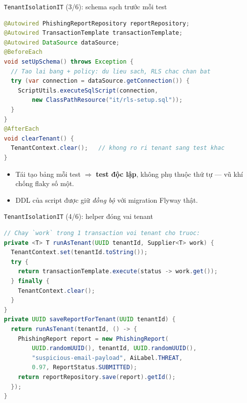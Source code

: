 \documentclass[aspectratio=169,12pt]{beamer}
\begin{document}
\begin{frame}[fragile]{\texttt{TenantIsolationIT} (3/6): schema sạch trước mỗi test}
  \vspace*{-0.4em}
\begin{lstlisting}[language=Java,style=code,basicstyle=\ttfamily\scriptsize]
@Autowired PhishingReportRepository reportRepository;
@Autowired TransactionTemplate transactionTemplate;
@Autowired DataSource dataSource;
@BeforeEach
void setUpSchema() throws Exception {
  // Tao lai bang + policy: du lieu sach, RLS chac chan bat
  try (var connection = dataSource.getConnection()) {
    ScriptUtils.executeSqlScript(connection,
        new ClassPathResource("it/rls-setup.sql"));
  }
}
@AfterEach
void clearTenant() {
  TenantContext.clear();   // khong ro ri tenant sang test khac
}
\end{lstlisting}
  \begin{itemize}\small
    \item Tái tạo bảng mỗi test $\Rightarrow$ \textbf{test độc lập}, không phụ
      thuộc thứ tự --- vũ khí chống flaky số một.
    \item DDL của script được giữ \emph{đồng bộ} với migration Flyway thật.
  \end{itemize}
\end{frame}

\begin{frame}[fragile]{\texttt{TenantIsolationIT} (4/6): helper đóng vai tenant}
  \vspace*{-0.8em}
\begin{lstlisting}[language=Java,style=code,basicstyle=\ttfamily\scriptsize]
// Chay `work` trong 1 transaction voi tenant cho truoc:
private <T> T runAsTenant(UUID tenantId, Supplier<T> work) {
  TenantContext.set(tenantId.toString());
  try {
    return transactionTemplate.execute(status -> work.get());
  } finally {
    TenantContext.clear();
  }
}
private UUID saveReportForTenant(UUID tenantId) {
  return runAsTenant(tenantId, () -> {
    PhishingReport report = new PhishingReport(
        UUID.randomUUID(), tenantId, UUID.randomUUID(),
        "suspicious-email-payload", AiLabel.THREAT,
        0.97, ReportStatus.SUBMITTED);
    return reportRepository.save(report).getId();
  });
}
\end{lstlisting}
\end{frame}
\end{document}
